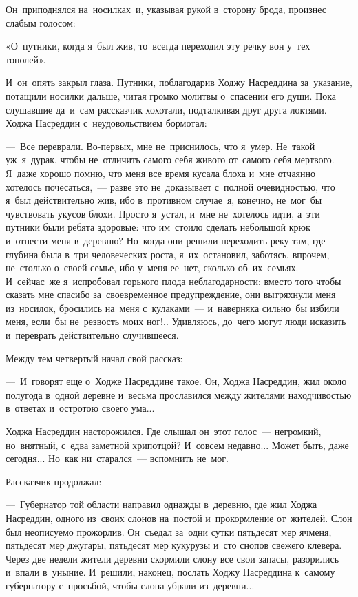 \documentclass[12pt,a4paper]{book}
\begin{document}
Он~приподнялся на~носилках~и, указывая рукой в~сторону брода, произнес слабым голосом:

«О~путники, когда я~был жив, то~всегда переходил эту речку вон у~тех тополей».

И~он~опять закрыл глаза. Путники, поблагодарив Ходжу Насреддина за~указание, потащили носилки дальше, читая громко молитвы о~спасении его души. Пока слушавшие да~и~сам рассказчик хохотали, подталкивая друг друга локтями. Ходжа Насреддин с~неудовольствием бормотал:

—~Все переврали. Во-первых, мне не~приснилось, что я~умер. Не~такой уж~я~дурак, чтобы не~отличить самого себя живого от~самого себя мертвого. Я~даже хорошо помню, что меня все время кусала блоха и~мне отчаянно хотелось почесаться,~— разве это не~доказывает с~полной очевидностью, что я~был действительно жив, ибо в~противном случае~я, конечно, не~мог~бы чувствовать укусов блохи. Просто я~устал, и~мне не~хотелось идти, а~эти путники были ребята здоровые: что им~стоило сделать небольшой крюк и~отнести меня в~деревню? Но~когда они решили переходить реку там, где глубина была в~три человеческих роста, я~их~остановил, заботясь, впрочем, не~столько о~своей семье, ибо у~меня ее~нет, сколько об~их~семьях. И~сейчас~же я~испробовал горького плода неблагодарности: вместо того чтобы сказать мне спасибо за~своевременное предупреждение, они вытряхнули меня из~носилок, бросились на~меня с~кулаками~— и~наверняка сильно~бы избили меня, если~бы не~резвость моих ног!.. Удивляюсь, до~чего могут люди исказить и~переврать действительно случившееся.

Между тем четвертый начал свой рассказ:

—~И~говорят еще о~Ходже Насреддине такое. Он, Ходжа Насреддин, жил около полугода в~одной деревне и~весьма прославился между жителями находчивостью в~ответах и~остротою своего ума...

Ходжа Насреддин насторожился. Где слышал он~этот голос~— негромкий, но~внятный, с~едва заметной хрипотцой? И~совсем недавно... Может быть, даже сегодня... Но~как ни~старался~— вспомнить не~мог.

Рассказчик продолжал:

—~Губернатор той области направил однажды в~деревню, где жил Ходжа Насреддин, одного из~своих слонов на~постой и~прокормление от~жителей. Слон был неописуемо прожорлив. Он~съедал за~одни сутки пятьдесят мер ячменя, пятьдесят мер джугары, пятьдесят мер кукурузы и~сто снопов свежего клевера. Через две недели жители деревни скормили слону все свои запасы, разорились и~впали в~уныние. И~решили, наконец, послать Ходжу Насреддина к~самому губернатору с~просьбой, чтобы слона убрали из~деревни...
\end{document}
